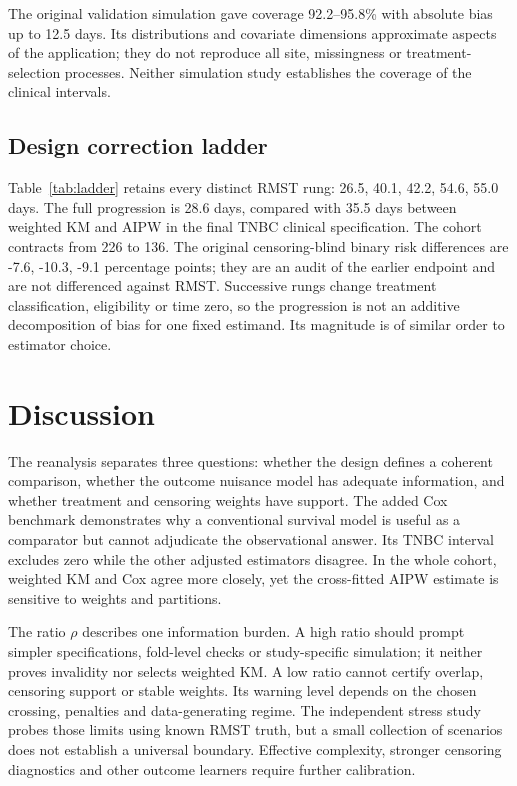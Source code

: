 \documentclass[12pt,letterpaper]{article}
\begin{document}
The original validation simulation gave coverage 92.2--95.8\% with absolute bias up to
12.5 days. Its distributions and covariate dimensions approximate aspects of the application;
they do not reproduce all site, missingness or treatment-selection processes.
Neither simulation study establishes the coverage of the clinical intervals.

\subsection{Design correction ladder}
Table~\ref{tab:ladder} retains every distinct RMST rung: 26.5, 40.1, 42.2, 54.6, 55.0 days.
The full progression is 28.6 days, compared with 35.5 days between weighted KM
and AIPW in the final TNBC clinical specification. The cohort contracts from 226 to 136.
The original censoring-blind binary risk differences are -7.6, -10.3, -9.1 percentage points;
they are an audit of the earlier endpoint and are not differenced against RMST.
Successive rungs change treatment classification, eligibility or time zero, so the progression is not an additive
decomposition of bias for one fixed estimand. Its magnitude is of similar order to estimator choice.

\section{Discussion}
The reanalysis separates three questions: whether the design defines a coherent comparison,
whether the outcome nuisance model has adequate information, and whether treatment and censoring weights
have support. The added Cox benchmark demonstrates why a conventional survival model is useful as a
comparator but cannot adjudicate the observational answer. Its TNBC interval excludes zero while the
other adjusted estimators disagree. In the whole cohort, weighted KM and Cox agree more closely,
yet the cross-fitted AIPW estimate is sensitive to weights and partitions.

The ratio $\rho$ describes one information burden. A high ratio should prompt simpler specifications,
fold-level checks or study-specific simulation; it neither proves invalidity nor selects weighted KM.
A low ratio cannot certify overlap, censoring support or stable weights. Its warning level depends on
the chosen crossing, penalties and data-generating regime. The independent stress study probes those limits
using known RMST truth, but a small collection of scenarios does not establish a universal boundary.
Effective complexity, stronger censoring diagnostics and other outcome learners require further calibration.
\end{document}
